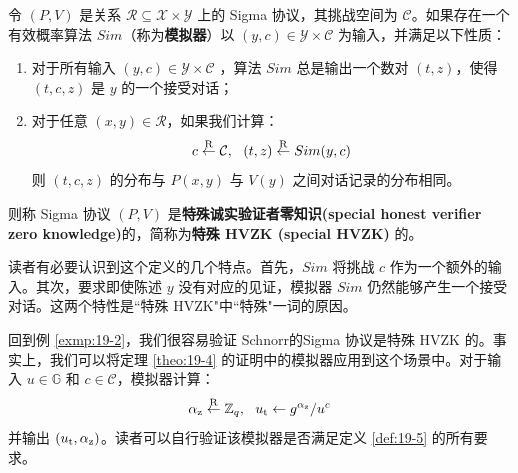 \begin{definition}[特殊诚实验证者零知识]
\label{def:19-5}
令 $(P,V)$ 是关系 $\mathcal{R}\subseteq\mathcal{X}×\mathcal{Y}$ 上的 Sigma 协议，其挑战空间为 $\mathcal{C}$。如果存在一个有效概率算法 ${Sim}$（称为\textbf{模拟器}）以 $(y,c)\in\mathcal{Y}\times\mathcal{C}$ 为输入，并满足以下性质：
\begin{enumerate}
	\item 对于所有输入 $(y,c)\in\mathcal{Y}\times\mathcal{C}$ ，算法 ${Sim}$ 总是输出一个数对 $(t,z)$，使得 $(t,c,z)$ 是 $y$ 的一个接受对话；
	\item 对于任意 $(x,y)\in\mathcal{R}$，如果我们计算：
	$$
    c\overset{\rm R}\leftarrow\mathcal{C},~~
    (t,z)\overset{\rm R}\leftarrow {Sim}(y,c)
    $$
    则 $(t,c,z)$ 的分布与 $P(x,y)$ 与 $V(y)$ 之间对话记录的分布相同。
\end{enumerate}
则称 Sigma 协议 $(P,V)$ 是\textbf{特殊诚实验证者零知识(special honest verifier zero knowledge)}的，简称为\textbf{特殊 HVZK (special HVZK)} 的。
\end{definition}

读者有必要认识到这个定义的几个特点。首先，${Sim}$ 将挑战 $c$ 作为一个额外的输入。其次，要求即使陈述 $y$ 没有对应的见证，模拟器 ${Sim}$ 仍然能够产生一个接受对话。这两个特性是``特殊 HVZK"中``特殊"一词的原因。

\begin{example}
回到例 \ref{exmp:19-2}，我们很容易验证 Schnorr的Sigma 协议是特殊 HVZK 的。事实上，我们可以将定理 \ref{theo:19-4} 的证明中的模拟器应用到这个场景中。对于输入 $u\in\mathbb{G}$ 和 $c\in\mathcal{C}$，模拟器计算：
$$
\alpha_{\rm z}\overset{\rm R}\leftarrow\mathbb{Z}_q,~~
u_{\rm t}\leftarrow{g^{\alpha_{\rm z}}}/{u^c}
$$
并输出 $(u_{\rm t},\alpha_{\rm z})$。读者可以自行验证该模拟器是否满足定义 \ref{def:19-5} 的所有要求。
\end{example}

